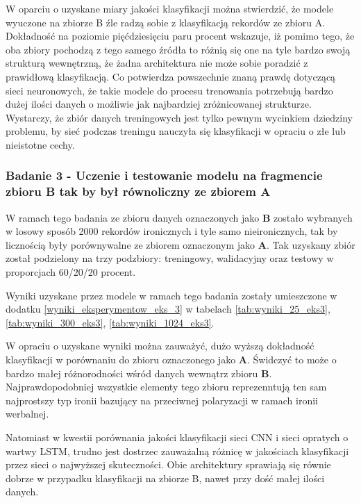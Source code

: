 W oparciu o uzyskane miary jakości klasyfikacji można stwierdzić, że modele wyuczone na zbiorze B źle radzą sobie z klasyfikacją rekordów ze zbioru A. Dokładność na poziomie pięćdziesięciu paru procent wskazuje, iż pomimo tego, że oba zbiory pochodzą z tego samego źródła to różnią się one na tyle bardzo swoją strukturą wewnętrzną, że żadna architektura nie może sobie poradzić z prawidłową klasyfikacją. Co potwierdza powszechnie znaną prawdę dotyczącą sieci neuronowych, że takie modele do procesu trenowania potrzebują bardzo dużej ilości danych o możliwie jak najbardziej zróżnicowanej strukturze. Wystarczy, że zbiór danych treningowych jest tylko pewnym wycinkiem dziedziny problemu, by sieć podczas treningu nauczyła się klasyfikacji w opraciu o złe lub nieistotne cechy.


\subsubsection{Badanie 3 - Uczenie i testowanie modelu na fragmencie zbioru B tak by był równoliczny ze zbiorem A}

W ramach tego badania ze zbioru danych oznaczonych jako \textbf{B} zostało wybranych w losowy sposób 2000 rekordów ironicznych i tyle samo nieironicznych, tak by licznością były porównywalne ze zbiorem oznaczonym jako \textbf{A}. Tak uzyskany zbiór został podzielony na trzy podzbiory: treningowy, walidacyjny oraz testowy w proporcjach 60/20/20 procent.

Wyniki uzyskane przez modele w ramach tego badania zostały umieszczone w dodatku \ref{wyniki_eksperymentow_eks_3} w tabelach \ref{tab:wyniki_25_eks3}, \ref{tab:wyniki_300_eks3}, \ref{tab:wyniki_1024_eks3}.



W opraciu o uzyskane wyniki można zauważyć, dużo wyższą dokładność klasyfikacji w porównaniu do zbioru oznaczonego jako \textbf{A}. Świdczyć to może o bardzo małej różnorodności wśród danych wewnątrz zbioru \textbf{B}. Najprawdopodobniej wszystkie elementy tego zbioru reprezenntują ten sam najprostszy typ ironii bazujący na przeciwnej polaryzacji w ramach ironii werbalnej.

Natomiast w kwestii porównania jakości klasyfikacji sieci CNN i sieci  opratych o wartwy LSTM, trudno jest dostrzec zauważalną różnicę w jakościach klasyfikacji przez sieci o najwyższej skuteczności. Obie architektury sprawiają się równie dobrze w przypadku klasyfikacji na zbiorze B, nawet przy dość małej ilości danych. 

